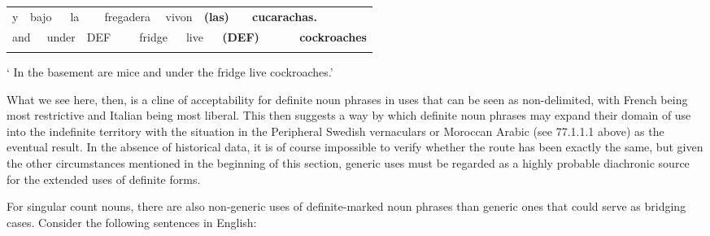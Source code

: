 \begin{tabular}{llllllllllllll}
\lsptoprule
y & \multicolumn{2}{l}{bajo

} & \multicolumn{2}{l}{la

} & \multicolumn{2}{l}{fregadera

} & \multicolumn{2}{l}{vivon

} & \multicolumn{2}{l}{{\bfseries *(las)}

} & \multicolumn{2}{l}{{\bfseries cucarachas.}

} & \\
\multicolumn{2}{l}{and

} & \multicolumn{2}{l}{under

} & \multicolumn{2}{l}{DEF

} & \multicolumn{2}{l}{fridge

} & \multicolumn{2}{l}{live

} & \multicolumn{2}{l}{{\bfseries (DEF)}

} & \multicolumn{2}{l}{{\bfseries cockroaches}

}\\
\lspbottomrule
\end{tabular}

\begin{styleTranslation}
‘ In the basement are mice and under the fridge live cockroaches.’  

\end{styleTranslation}

\begin{styleBodyTextFirst}
What we see here, then, is a cline of acceptability for definite noun phrases in uses that can be seen as non-delimited, with French being most restrictive and Italian being most liberal. This then suggests a way by which definite noun phrases may expand their domain of use into the indefinite territory with the situation in the Peripheral Swedish vernaculars or Moroccan Arabic (see 77.1.1.1 above) as the eventual result. In the absence of historical data, it is of course impossible to verify whether the route has been exactly the same, but given the other circumstances mentioned in the beginning of this section, generic uses must be regarded as a highly probable diachronic source for the extended uses of definite forms. 

\end{styleBodyTextFirst}

\begin{styleBodytextC}
For singular count nouns, there are also non-generic uses of definite-marked noun phrases than generic ones that could serve as bridging cases. Consider the following sentences in English:

\end{styleBodytextC}

